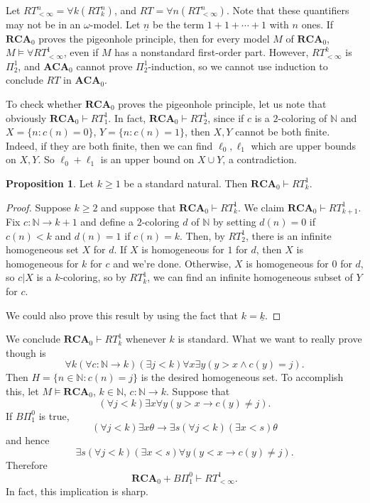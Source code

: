 \documentclass[12pt]{book}
\newcommand{\NN}{\mathbb{N}}
\newcommand{\ACA}{\mathbf{ACA}}
\newcommand{\RCA}{\mathbf{RCA}}
\theoremstyle{definition}
\newtheorem{proposition}[theorem]{Proposition}
\begin{document}
Let $RT_{<\infty}^n = \forall k(RT^n_k)$, and $RT = \forall n(RT_{<\infty}^n)$. Note that these quantifiers may not be in an $\omega$-model.
Let $\underline n$ be the term $1 + 1 + \cdots + 1$ with $n$ ones.
If $\RCA_0$ proves the pigeonhole principle, then for every model $M$ of $\RCA_0$, $M \models \forall RT^1_{<\infty}$, even if $M$ has a nonstandard first-order part.
However, $RT^k_{<\infty}$ is $\Pi_2^1$, and $\ACA_0$ cannot prove $\Pi_2^1$-induction, so we cannot use induction to conclude $RT$ in $\ACA_0$.

To check whether $\RCA_0$ proves the pigeonhole principle, let us note that obviously $\RCA_0 \vdash RT_1^1$. In fact, $\RCA_0 \vdash RT_2^1$, since if $c$ is a $2$-coloring of $\NN$ and $X = \{n: c(n) = 0\}$, $Y = \{n: c(n) = 1\}$, then $X,Y$ cannot be both finite.
Indeed, if they are both finite, then we can find $\ell_0,\ell_1$ which are upper bounds on $X, Y$. So $\ell_0 + \ell_1$ is an upper bound on $X \cup Y$, a contradiction.

\begin{proposition}
Let $k \geq 1$ be a standard natural. Then $\RCA_0 \vdash RT_k^1$.
\end{proposition}
\begin{proof}
Suppose $k \geq 2$ and suppose that $\RCA_0 \vdash RT_k^1$.
We claim $\RCA_0 \vdash RT_{k+1}^1$. Fix $c: \NN \to k + 1$ and define a $2$-coloring $d$ of $\NN$ by setting $d(n) = 0$ if $c(n) < k$ and $d(n) = 1$ if $c(n) = k$.
Then, by $RT_2^1$, there is an infinite homogeneous set $X$ for $d$.
If $X$ is homogeneous for $1$ for $d$, then $X$ is homogeneous for $k$ for $c$ and we're done.
Otherwise, $X$ is homogeneous for $0$ for $d$, so $c|X$ is a $k$-coloring, so by $RT_k^1$, we can find an infinite homogeneous subset of $Y$ for $c$.

We could also prove this result by using the fact that $k = \underline k$.
\end{proof}

We conclude $\RCA_0 \vdash RT_k^1$ whenever $k$ is standard.
What we want to really prove though is
$$\forall k(\forall c: \NN \to k)(\exists j < k)\forall x \exists y(y > x \wedge c(y) = j).$$
Then $H = \{n \in \NN: c(n) = j\}$ is the desired homogeneous set.
To accomplish this, let $M \models \RCA_0$, $k \in \NN$, $c: \NN \to k$.
Suppose that
$$(\forall j < k)\exists x \forall y(y > x \to c(y) \neq j).$$
If $B\Pi_1^0$ is true,
$$(\forall j < k)\exists x\theta \to \exists s(\forall j < k)(\exists x < s)\theta$$
and hence
$$\exists s(\forall j < k)(\exists x < s)\forall y(y < x \to c(y) \neq j).$$
Therefore
$$\RCA_0 + B\Pi_1^0 \vdash RT_{<\infty}^1.$$
In fact, this implication is sharp.
\end{document}
